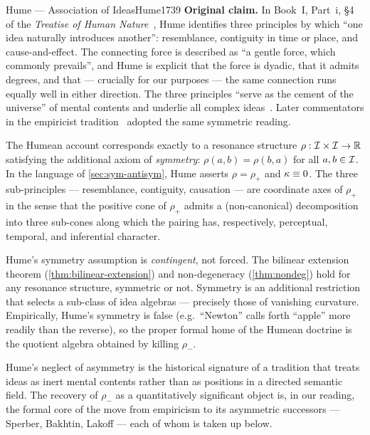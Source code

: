 \begin{zooentry}{Hume --- Association of Ideas}{Hume1739}
\textbf{Original claim.} In Book~I, Part~i, \S 4 of the \emph{Treatise of
Human Nature}~\cite{Hume1739}, Hume identifies three principles by which
``one idea naturally introduces another'': resemblance, contiguity in time
or place, and cause-and-effect. The connecting force is described as
``a gentle force, which commonly prevails'', and Hume is explicit that the
force is dyadic, that it admits degrees, and that --- crucially for our
purposes --- the same connection runs equally well in either direction.
The three principles ``serve as the cement of the universe'' of mental
contents and underlie all complex
ideas~\cite[Bk.~I, Pt.~i, \S 4]{Hume1739}. Later commentators in the
empiricist tradition~\cite{Locke1690} adopted the same symmetric reading.

\formalclaim
The Humean account corresponds exactly to a resonance structure
$\rho:\mathcal{I}\times\mathcal{I}\to\mathbb{R}$ satisfying the additional axiom of
\emph{symmetry}: $\rho(a,b)=\rho(b,a)$ for all $a,b\in\mathcal{I}$. In the
language of \cref{sec:sym-antisym}, Hume asserts $\rho=\rho_+$ and
$\kappa\equiv 0$. The three sub-principles --- resemblance, contiguity,
causation --- are coordinate axes of $\rho_+$ in the sense that the
positive cone of $\rho_+$ admits a (non-canonical) decomposition into three
sub-cones along which the pairing has, respectively, perceptual, temporal,
and inferential character.

\formalstatus
Hume's symmetry assumption is \emph{contingent}, not forced. The bilinear
extension theorem (\cref{thm:bilinear-extension}) and non-degeneracy
(\cref{thm:nondeg}) hold for any resonance structure, symmetric or not.
Symmetry is an additional restriction that selects a sub-class of idea
algebras --- precisely those of vanishing curvature. Empirically, Hume's
symmetry is false (e.g.\ ``Newton'' calls forth ``apple'' more readily than
the reverse), so the proper formal home of the Humean doctrine is the
quotient algebra obtained by killing $\rho_-$.

\litcomment
Hume's neglect of asymmetry is the historical signature of a tradition that
treats ideas as inert mental contents rather than as positions in a
directed semantic field. The recovery of $\rho_-$ as a quantitatively
significant object is, in our reading, the formal core of the move from
empiricism to its asymmetric successors --- Sperber, Bakhtin, Lakoff ---
each of whom is taken up below.
\end{zooentry}

